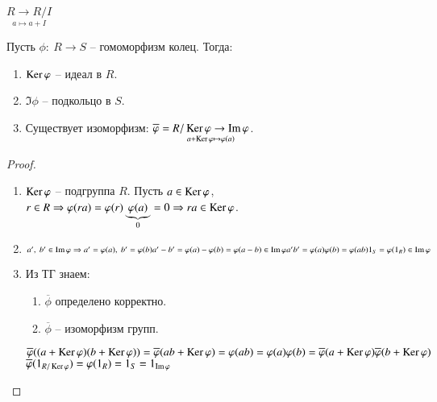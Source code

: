 \documentclass[main]{subfiles}
\begin{document}
\begin{example}
    $\underset{a \mapsto a+I}{R \rightarrow R/I}$
\end{example}

\begin{theorem}
    Пусть $\phi: \ R \rightarrow S$ -- гомоморфизм колец. Тогда:
    \begin{enumerate}
        \item $\Ker \phi$ -- идеал в $R$.
        \item $\Im \phi$ -- подкольцо в $S$.
        \item Существует изоморфизм: $\overline{\phi} = \underset{a+\Ker \phi \mapsto \phi(a)}{R/\Ker \phi \rightarrow \Im \phi}$.
    \end{enumerate}
\end{theorem}

\begin{proof}
    \begin{enumerate}
        \item $\Ker \phi$ -- подгруппа $R$. Пусть $a \in \Ker \phi$, $r \in R \Rightarrow
        \phi(ra) = \phi(r)\underbrace{\phi(a)}_{0} = 0 \Rightarrow ra \in \Ker \phi$.
        \item $a', \ b' \in \Im \phi \Rightarrow a' = \phi(a), \ b' = \phi(b) \\
        a' - b' = \phi (a) - \phi (b) = \phi (a - b) \in \Im \phi \\
        a'b' = \phi (a) \phi (b) = \phi (ab) \\
        1_S = \phi(1_R) \in \Im \phi$
        \item Из ТГ знаем:
        \begin{enumerate}
            \item $\overline{\phi}$ определено корректно.
            \item $\overline{\phi}$ -- изоморфизм групп.
        \end{enumerate}
        $\overline{\phi}((a + \Ker \phi)(b + \Ker \phi)) = 
        \overline{\phi}(ab + \Ker \phi) = \phi(ab) = \phi(a)\phi(b) = \overline{\phi}(a + \Ker \phi) \overline{\phi}(b + \Ker \phi)$ \\
        $\overline{\phi}(1_{R/\Ker \phi}) = \phi(1_R) = 1_S = 1_{\Im \phi}$

    \end{enumerate}
\end{proof}
\end{document}
